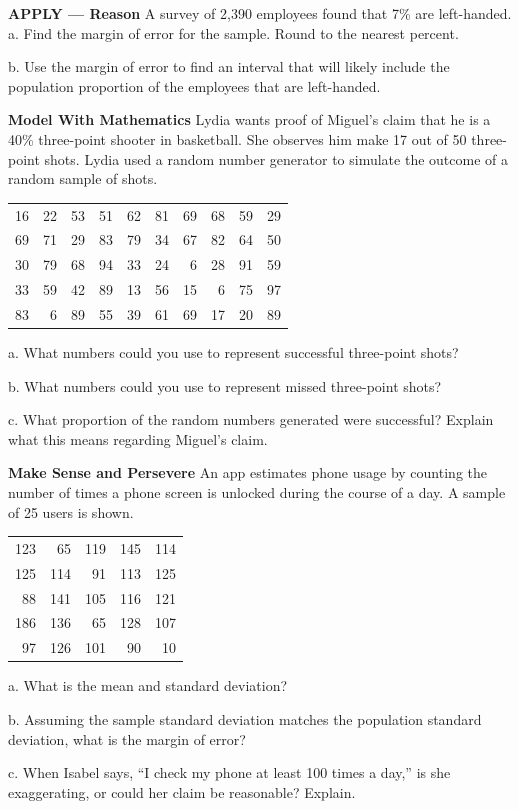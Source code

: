 \documentclass{article}
\newenvironment{practice}[2]{}{}        %
\newcommand{\answer}[1]{}               %
\newcommand{\te}[1]{}                   %
\begin{document}
\begin{practice}{18}{2}
\textbf{APPLY — Reason} A survey of 2,390 employees found that 7\% are left-handed.
a. Find the margin of error for the sample. Round to the nearest percent.
\answer{a. (\pm2\%)}
b. Use the margin of error to find an interval that will likely include the population proportion of the employees that are left-handed.
\answer{b. 5\% to 9\%}
\end{practice}
\begin{practice}{19}{2}
\textbf{Model With Mathematics} Lydia wants proof of Miguel's claim that he is a 40\% three-point shooter in basketball. She observes him make 17 out of 50 three-point shots. Lydia used a random number generator to simulate the outcome of a random sample of shots.
\begin{tabular}{rrrrrrrrrr}
16 & 22 & 53 & 51 & 62 & 81 & 69 & 68 & 59 & 29 \\
69 & 71 & 29 & 83 & 79 & 34 & 67 & 82 & 64 & 50 \\
30 & 79 & 68 & 94 & 33 & 24 & 6 & 28 & 91 & 59 \\
33 & 59 & 42 & 89 & 13 & 56 & 15 & 6 & 75 & 97 \\
83 & 6 & 89 & 55 & 39 & 61 & 69 & 17 & 20 & 89 \\
\end{tabular}
a. What numbers could you use to represent successful three-point shots?
\answer{a. Sample: 1–40}
b. What numbers could you use to represent missed three-point shots?
\answer{b. Sample: 41–100}
c. What proportion of the random numbers generated were successful? Explain what this means regarding Miguel's claim.
\answer{c. 36\%; This one simulation does not refute Mike's claim, as 36\% is relatively close to the observed percentage of 34\%.}
\te{Printed Mike in the key; the prompt names Miguel.}
\end{practice}
\begin{practice}{20}{2}
\textbf{Make Sense and Persevere} An app estimates phone usage by counting the number of times a phone screen is unlocked during the course of a day. A sample of 25 users is shown.
\begin{tabular}{rrrrr}
123 & 65 & 119 & 145 & 114 \\
125 & 114 & 91 & 113 & 125 \\
88 & 141 & 105 & 116 & 121 \\
186 & 136 & 65 & 128 & 107 \\
97 & 126 & 101 & 90 & 10 \\
\end{tabular}
a. What is the mean and standard deviation?
\answer{a. mean: 110.04; standard deviation: 32.72}
b. Assuming the sample standard deviation matches the population standard deviation, what is the margin of error?
\answer{b. (\pm13.09)}
c. When Isabel says, “I check my phone at least 100 times a day,” is she exaggerating, or could her claim be reasonable? Explain.
\answer{c. Isabel's claim is reasonable. According to the data, the range of reasonable means is from 96.95 to 123.13, so if Isabel is an average user, she is not exaggerating.}
\end{practice}
\end{document}
